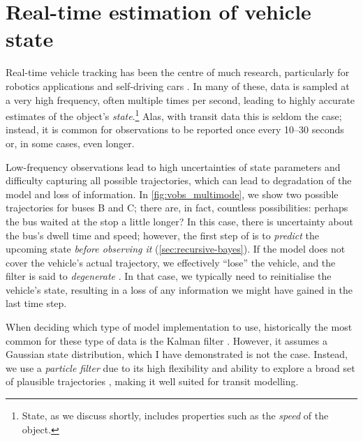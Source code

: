 \section{Real-time estimation of vehicle state}
\label{sec:vehicle_model}

Real-time vehicle tracking has been the centre of much research, particularly for robotics applications and self-driving cars \citep{Daum_2005, Gustafsson_2002}. In many of these, data is sampled at a very high frequency, often multiple times per second, leading to highly accurate estimates of the object's \emph{state}.\footnote{State, as we discuss shortly, includes properties such as the \emph{speed} of the object.} Alas, with transit data this is seldom the case; instead, it is common for observations to be reported once every 10--30 seconds or, in some cases, even longer.

Low-frequency observations lead to high uncertainties of state parameters and difficulty capturing all possible trajectories, which can lead to degradation of the model and loss of information. In \cref{fig:vobs_multimode}, we show two possible trajectories for buses B and C; there are, in fact, countless possibilities: perhaps the bus waited at the stop a little longer? In this case, there is uncertainty about the bus's dwell time and speed; however, the first step of  is to \emph{predict} the upcoming state \emph{before observing it} (\cref{sec:recursive-bayes}). If the model does not cover the vehicle's actual trajectory, we effectively ``lose'' the vehicle, and the filter is said to \emph{degenerate} \citep{Chen_2014}. In that case, we typically need to reinitialise the vehicle's state, resulting in a loss of any information we might have gained in the last time step.

When deciding which type of model implementation to use, historically the most common for these type of data is the Kalman filter \citep{Wall_1999, Dailey_2001, Cathey_2003}. However, it assumes a Gaussian state distribution, which I have demonstrated is not the case. Instead, we use a \emph{particle filter} due to its high flexibility and ability to explore a broad set of plausible trajectories \citep{Hans_2015}, making it well suited for transit modelling.

